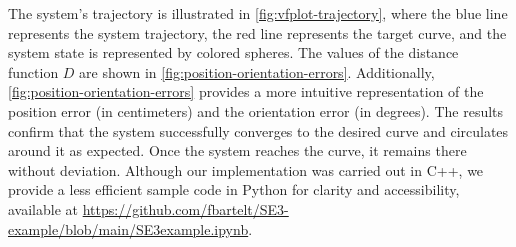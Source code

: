 The system's trajectory is illustrated in \cref{fig:vfplot-trajectory}, where the blue line represents the system trajectory, the red line represents the target curve, and the system state is represented by colored spheres. The values of the distance function $D$ are shown in \cref{fig:position-orientation-errors}. Additionally, \cref{fig:position-orientation-errors} provides a more intuitive representation of the position error (in centimeters) and the orientation error (in degrees). The results confirm that the system successfully converges to the desired curve and circulates around it as expected. Once the system reaches the curve, it remains there without deviation. Although our implementation was carried out in C++, we provide a less efficient sample code in Python for clarity and accessibility, available at \url{https://github.com/fbartelt/SE3-example/blob/main/SE3example.ipynb}.

